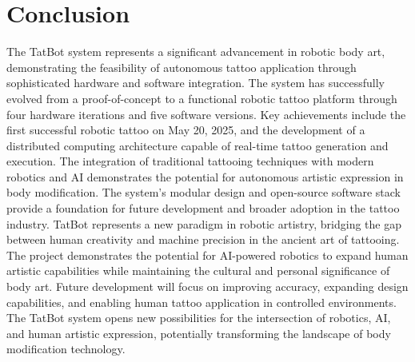 \documentclass[11pt]{article}
\begin{document}
\section{Conclusion}

The TatBot system represents a significant advancement in robotic body art, demonstrating the feasibility of autonomous tattoo application through sophisticated hardware and software integration.
The system has successfully evolved from a proof-of-concept to a functional robotic tattoo platform through four hardware iterations and five software versions.
Key achievements include the first successful robotic tattoo on May 20, 2025, and the development of a distributed computing architecture capable of real-time tattoo generation and execution.
The integration of traditional tattooing techniques with modern robotics and AI demonstrates the potential for autonomous artistic expression in body modification.
The system's modular design and open-source software stack provide a foundation for future development and broader adoption in the tattoo industry.
TatBot represents a new paradigm in robotic artistry, bridging the gap between human creativity and machine precision in the ancient art of tattooing.
The project demonstrates the potential for AI-powered robotics to expand human artistic capabilities while maintaining the cultural and personal significance of body art.
Future development will focus on improving accuracy, expanding design capabilities, and enabling human tattoo application in controlled environments.
The TatBot system opens new possibilities for the intersection of robotics, AI, and human artistic expression, potentially transforming the landscape of body modification technology.



\end{document}
